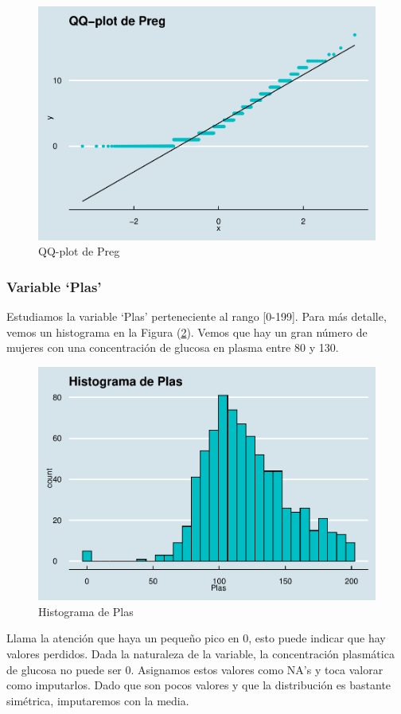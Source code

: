\documentclass[
]{article}
\begin{document}
\begin{figure}

{\centering \includegraphics[width=0.5\linewidth]{pima-clasificacion_files/figure-latex/qq_preg-1} 

}

\caption{QQ-plot de Preg}\label{fig:qq_preg}
\end{figure}

\hypertarget{variable-plas}{%
\subsubsection{Variable `Plas'}\label{variable-plas}}

Estudiamos la variable `Plas' perteneciente al rango {[}0-199{]}. Para
más detalle, vemos un histograma en la Figura (\ref{fig:hist_plas}).
Vemos que hay un gran número de mujeres con una concentración de glucosa
en plasma entre 80 y 130.

\begin{figure}

{\centering \includegraphics[width=0.5\linewidth]{pima-clasificacion_files/figure-latex/hist_plas-1} 

}

\caption{Histograma de Plas}\label{fig:hist_plas}
\end{figure}

Llama la atención que haya un pequeño pico en 0, esto puede indicar que
hay valores perdidos. Dada la naturaleza de la variable, la
concentración plasmática de glucosa no puede ser 0. Asignamos estos
valores como NA's y toca valorar como imputarlos. Dado que son pocos
valores y que la distribución es bastante simétrica, imputaremos con la
media.
\end{document}

